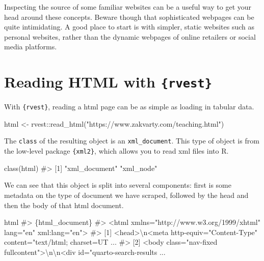 \documentclass[
  letterpaper,
  DIV=11,
  numbers=noendperiod]{scrreprt}
\newenvironment{Shaded}{\begin{snugshade}}{\end{snugshade}}
\newcommand{\CommentTok}[1]{\textcolor[rgb]{0.37,0.37,0.37}{#1}}
\newcommand{\FunctionTok}[1]{\textcolor[rgb]{0.28,0.35,0.67}{#1}}
\newcommand{\NormalTok}[1]{\textcolor[rgb]{0.00,0.23,0.31}{#1}}
\newcommand{\OtherTok}[1]{\textcolor[rgb]{0.00,0.23,0.31}{#1}}
\newcommand{\SpecialCharTok}[1]{\textcolor[rgb]{0.37,0.37,0.37}{#1}}
\newcommand{\StringTok}[1]{\textcolor[rgb]{0.13,0.47,0.30}{#1}}
\begin{document}
Inspecting the source of some familiar websites can be a useful way to
get your head around these concepts. Beware though that sophisticated
webpages can be quite intimidating. A good place to start is with
simpler, static websites such as personal websites, rather than the
dynamic webpages of online retailers or social media platforms.

\section{\texorpdfstring{Reading HTML with
\texttt{\{rvest\}}}{Reading HTML with \{rvest\}}}\label{reading-html-with-rvest}

With \texttt{\{rvest\}}, reading a html page can be as simple as loading
in tabular data.

\begin{Shaded}
\begin{Highlighting}[]
\NormalTok{html }\OtherTok{\textless{}{-}}\NormalTok{ rvest}\SpecialCharTok{::}\FunctionTok{read\_html}\NormalTok{(}\StringTok{"https://www.zakvarty.com/teaching.html"}\NormalTok{)}
\end{Highlighting}
\end{Shaded}

The \texttt{class} of the resulting object is an \texttt{xml\_document}.
This type of object is from the low-level package \texttt{\{xml2\}},
which allows you to read xml files into R.

\begin{Shaded}
\begin{Highlighting}[]
\FunctionTok{class}\NormalTok{(html)}
\CommentTok{\#\textgreater{} [1] "xml\_document" "xml\_node"}
\end{Highlighting}
\end{Shaded}

We can see that this object is split into several components: first is
some metadata on the type of document we have scraped, followed by the
head and then the body of that html document.

\begin{Shaded}
\begin{Highlighting}[]
\NormalTok{html}
\CommentTok{\#\textgreater{} \{html\_document\}}
\CommentTok{\#\textgreater{} \textless{}html xmlns="http://www.w3.org/1999/xhtml" lang="en" xml:lang="en"\textgreater{}}
\CommentTok{\#\textgreater{} [1] \textless{}head\textgreater{}\textbackslash{}n\textless{}meta http{-}equiv="Content{-}Type" content="text/html; charset=UT ...}
\CommentTok{\#\textgreater{} [2] \textless{}body class="nav{-}fixed fullcontent"\textgreater{}\textbackslash{}n\textbackslash{}n\textless{}div id="quarto{-}search{-}results ...}
\end{Highlighting}
\end{Shaded}
\end{document}

